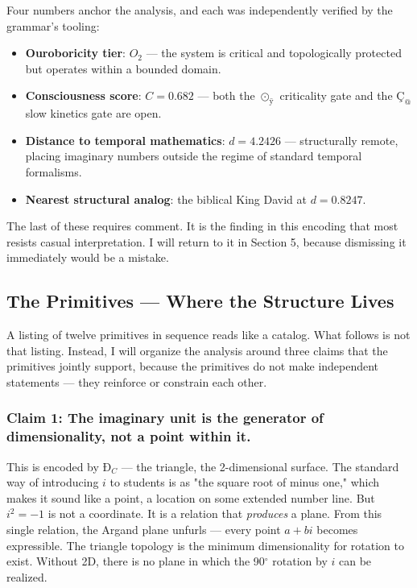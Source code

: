 \documentclass[12pt,a4paper]{article}
\begin{document}
Four numbers anchor the analysis, and each was independently verified by the grammar's tooling:

\begin{itemize}
    \item \textbf{Ouroboricity tier}: $O_2$ --- the system is critical and topologically protected but operates within a bounded domain.
    \item \textbf{Consciousness score}: $C = 0.682$ --- both the $⊙_{ÿ}$ criticality gate and the $Ç_{@}$ slow kinetics gate are open.
    \item \textbf{Distance to temporal mathematics}: $d = 4.2426$ --- structurally remote, placing imaginary numbers outside the regime of standard temporal formalisms.
    \item \textbf{Nearest structural analog}: the biblical King David at $d = 0.8247$.
\end{itemize}

The last of these requires comment. It is the finding in this encoding that most resists casual interpretation. I will return to it in Section 5, because dismissing it immediately would be a mistake.

\subsection{The Primitives --- Where the Structure Lives}

A listing of twelve primitives in sequence reads like a catalog. What follows is not that listing. Instead, I will organize the analysis around three claims that the primitives jointly support, because the primitives do not make independent statements --- they reinforce or constrain each other.

\subsubsection{Claim 1: The imaginary unit is the generator of dimensionality, not a point within it.}

This is encoded by $Ð_{C}$ --- the triangle, the 2-dimensional surface. The standard way of introducing $i$ to students is as "the square root of minus one," which makes it sound like a point, a location on some extended number line. But $i^2 = -1$ is not a coordinate. It is a relation that \emph{produces} a plane. From this single relation, the Argand plane unfurls --- every point $a + bi$ becomes expressible. The triangle topology is the minimum dimensionality for rotation to exist. Without 2D, there is no plane in which the 90$^{\circ}$ rotation by $i$ can be realized.
\end{document}
